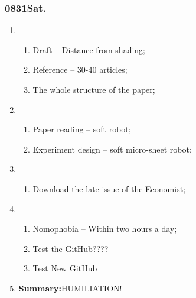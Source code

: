 \subsubsection{0831Sat.}
\begin{enumerate}
	\item \ncquaone
	\begin{enumerate}[(1)]
		\item Draft -- Distance from shading;\rightundoneBlack
		\item Reference -- 30-40 articles;\rightundoneBlack
		\item The whole structure of the paper;\rightundoneBlack
	\end{enumerate}
	
	\item \ncquatwo	
	\begin{enumerate}[(1)]
		\item Paper reading -- soft robot;\rightundoneBlack
		\item Experiment design -- soft micro-sheet robot;\rightundoneBlack
	\end{enumerate}
	
	\item \ncquathree
	\begin{enumerate}[(1)]
		\item Download the late issue of the Economist;\rightundoneBlack
	\end{enumerate}
	
	\item \ncquafour	
	\begin{enumerate}[(1)]
		\item Nomophobia -- Within two hours a day;\rightundoneBlack
		\item Test the GitHub????
		\item Test New GitHub
	\end{enumerate}
	\item \textbf{Summary:}HUMILIATION! 
\end{enumerate}
